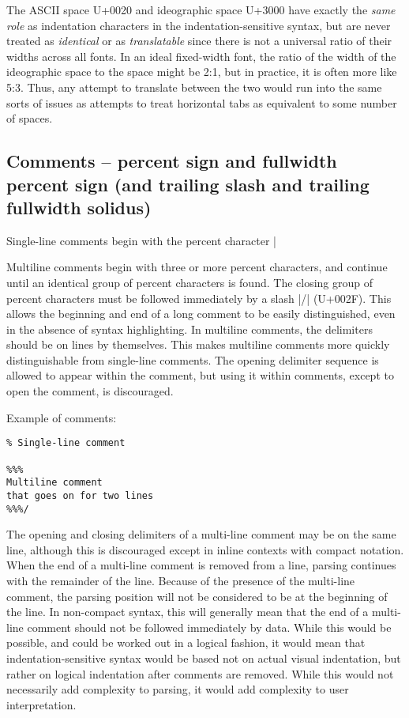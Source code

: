 \documentclass[11pt]{article}
\begin{document}
The ASCII space U+0020 and ideographic space U+3000 have exactly the \emph{same role} as indentation characters in the indentation-sensitive syntax, but are never treated as \emph{identical} or as \emph{translatable} since there is not a universal ratio of their widths across all fonts.  In an ideal fixed-width font, the ratio of the width of the ideographic space to the space might be 2:1, but in practice, it is often more like 5:3.  Thus, any attempt to translate between the two would run into the same sorts of issues as attempts to treat horizontal tabs as equivalent to some number of spaces.


\subsection{Comments -- percent sign and fullwidth percent sign (and trailing slash and trailing fullwidth solidus)}

Single-line comments begin with the percent character |%

Multiline comments begin with three or more percent characters, and continue until an identical group of percent characters is found.  The closing group of percent characters must be followed immediately by a slash |/| (U+002F).  This allows the beginning and end of a long comment to be easily distinguished, even in the absence of syntax highlighting.  In multiline comments, the delimiters should be on lines by themselves.  This makes multiline comments more quickly distinguishable from single-line comments.  The opening delimiter sequence is allowed to appear within the comment, but using it within comments, except to open the comment, is discouraged.

Example of comments:
\begin{Verbatim}
% Single-line comment

%%% 
Multiline comment
that goes on for two lines
%%%/
\end{Verbatim}

The opening and closing delimiters of a multi-line comment may be on the same line, although this is discouraged except in inline contexts with compact notation.  When the end of a multi-line comment is removed from a line, parsing continues with the remainder of the line.  Because of the presence of the multi-line comment, the parsing position will not be considered to be at the beginning of the line.  In non-compact syntax, this will generally mean that the end of a multi-line comment should not be followed immediately by data.  While this would be possible, and could be worked out in a logical fashion, it would mean that indentation-sensitive syntax would be based not on actual visual indentation, but rather on logical indentation after comments are removed.  While this would not necessarily add complexity to parsing, it would add complexity to user interpretation.
\end{document}
